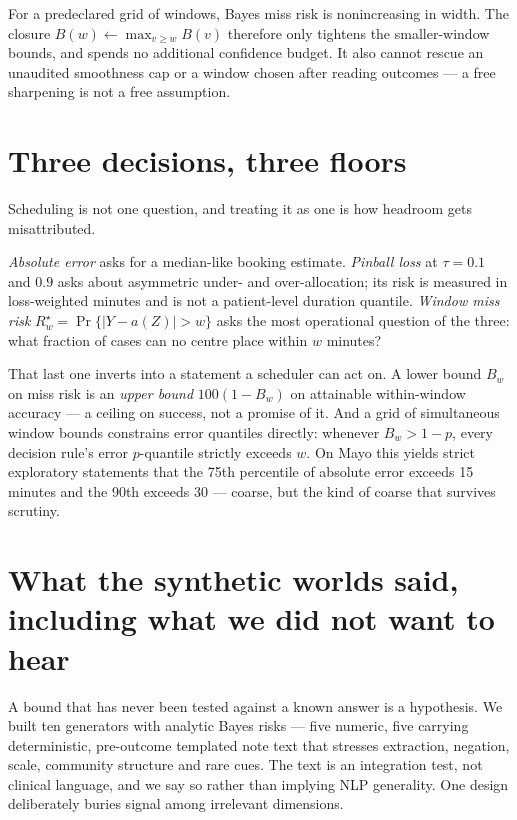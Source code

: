 \documentclass[11pt,a4paper]{article}
\newcommand{\risk}{R^{\star}}
\begin{document}
For a predeclared grid of windows, Bayes miss risk is nonincreasing in width. The closure $B(w)\leftarrow\max_{v\geq w}B(v)$ therefore only tightens the smaller-window bounds, and spends no additional confidence budget. It also cannot rescue an unaudited smoothness cap or a window chosen after reading outcomes --- a free sharpening is not a free assumption.

\section{Three decisions, three floors}

Scheduling is not one question, and treating it as one is how headroom gets misattributed.

\emph{Absolute error} asks for a median-like booking estimate. \emph{Pinball loss} at $\tau=0.1$ and $0.9$ asks about asymmetric under- and over-allocation; its risk is measured in loss-weighted minutes and is not a patient-level duration quantile. \emph{Window miss risk} $\risk_w=\Pr\{|Y-a(Z)|>w\}$ asks the most operational question of the three: what fraction of cases can no centre place within $w$ minutes?

That last one inverts into a statement a scheduler can act on. A lower bound $B_w$ on miss risk is an \emph{upper bound} $100(1-B_w)$ on attainable within-window accuracy --- a ceiling on success, not a promise of it. And a grid of simultaneous window bounds constrains error quantiles directly: whenever $B_w>1-p$, every decision rule's error $p$-quantile strictly exceeds $w$. On Mayo this yields strict exploratory statements that the 75th percentile of absolute error exceeds 15 minutes and the 90th exceeds 30 --- coarse, but the kind of coarse that survives scrutiny.

\section{What the synthetic worlds said, including what we did not want to hear}

A bound that has never been tested against a known answer is a hypothesis. We built ten generators with analytic Bayes risks --- five numeric, five carrying deterministic, pre-outcome templated note text that stresses extraction, negation, scale, community structure and rare cues. The text is an integration test, not clinical language, and we say so rather than implying NLP generality. One design deliberately buries signal among irrelevant dimensions.
\end{document}
